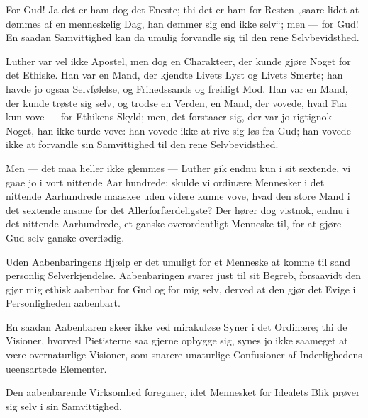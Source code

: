 \documentclass[12pt,a4paper]{book}
\newcommand{\apage}[1]{\marginnote{\footnotesize\textit{[#1]}}}
\begin{document}
For Gud! Ja det er ham dog det Eneste; thi det er ham for Resten „saare
lidet at dømmes af en menneskelig Dag, han dømmer sig end ikke selv“;
men — for Gud! En saadan Samvittighed kan da umulig forvandle sig til den
rene Selvbevidsthed.

Luther var vel ikke Apostel, men dog en Charakteer, der kunde gjøre Noget
for det Ethiske. Han var en Mand, der kjendte Livets Lyst og Livets
Smerte; han havde jo ogsaa Selvfølelse, og Frihedssands og freidigt Mod.
Han var en Mand, der kunde trøste sig selv, og trodse en Verden, en Mand,
der vovede, hvad Faa kun vove — for Ethikens Skyld; men, det forstaaer
sig, der var jo rigtignok Noget, han ikke turde vove: han vovede ikke at
rive sig løs fra Gud; han vovede ikke at forvandle sin Samvittighed til
den rene Selvbevidsthed.

Men — det maa heller ikke glemmes — Luther gik endnu kun i sit sextende,
vi gaae jo i vort nittende Aar\-%
hundrede: skulde vi ordinære Mennesker i det nittende Aarhundrede
maaskee uden videre kunne vove, hvad den store Mand i det sextende
ansaae for det Allerforfærdeligste? Der \apage{127} hører dog vistnok, endnu i det
nittende Aarhundrede, et ganske overordentligt Menneske til, for at
gjøre Gud selv ganske overflødig.

Uden Aabenbaringens Hjælp er det umuligt for et Menneske at komme til
sand personlig Selverkjendelse. Aabenbaringen svarer just til sit
Begreb, forsaavidt den gjør mig ethisk aabenbar for Gud og for mig selv,
derved at den gjør det Evige i Personligheden aabenbart.

En saadan Aabenbaren skeer ikke ved mirakuløse Syner i det Ordinære; thi
de Visioner, hvorved Pietisterne saa gjerne opbygge sig, synes jo ikke
saameget at være overnaturlige Visioner, som snarere unaturlige
Confusioner af Inderlighedens ueensartede Elementer.

Den aabenbarende Virksomhed foregaaer, idet Mennesket for Idealets Blik
prøver sig selv i sin Samvittighed.
\end{document}
